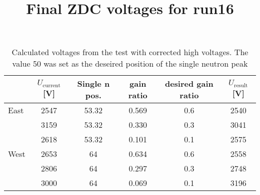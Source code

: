 \documentclass[a4paper,10pt]{article}
\title{Final ZDC voltages for run16}
\author{}
\date{}
\begin{document}
\maketitle

\begin{table}[htb] 
\caption{Calculated voltages from the test with corrected high voltages.
The value 50 was set as the deseired position of the single neutron peak}
\label{corected}
\begin{center}
\begin{tabular}{lccccc}
 \toprule
 &$U_\text{current}$[V]&Single n pos.&gain ratio&desired gain ratio&$U_\text{result}$[V]\\
\midrule
 East&2547&53.32&0.569&0.6&2540\\
     &3159&53.32&0.330&0.3&3041\\
     &2618&53.32&0.101&0.1&2575\\
\midrule
West  &2653  &64 &0.634 &0.6 &2558 \\
      &2806  &64 &0.297 &0.3 &2748 \\
      &3000  &64 &0.069 &0.1 &3196 \\
\bottomrule
\end{tabular}
\end{center}
\end{table}
\end{document}
